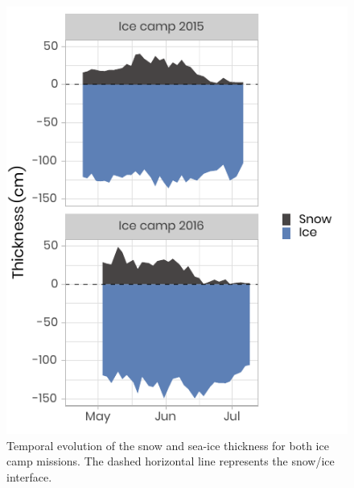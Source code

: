 \documentclass[12pt,a4paper]{scrartcl}
\begin{document}
\begin{figure}[h]
	\centering
	\includegraphics[scale = 1]{../../../graphs/fig02.pdf}
	\caption{Temporal evolution of the snow and sea-ice thickness for both ice camp missions. The dashed horizontal line represents the snow/ice interface.}
\end{figure}

\clearpage
\newpage
\end{document}
